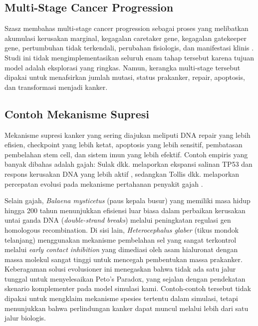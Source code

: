 \subsection{Multi-Stage Cancer Progression}

Szasz membahas multi-stage cancer progression sebagai proses yang melibatkan akumulasi
kerusakan marginal, kegagalan caretaker gene, kegagalan gatekeeper gene,
pertumbuhan tidak terkendali, perubahan fisiologis, dan manifestasi klinis
\cite{szasz2024}. Studi ini tidak mengimplementasikan seluruh enam tahap
tersebut karena tujuan model adalah eksplorasi yang ringkas. Namun, kerangka
multi-stage tersebut dipakai untuk menafsirkan jumlah mutasi, status
prakanker, repair, apoptosis, dan transformasi menjadi kanker.

\subsection{Contoh Mekanisme Supresi}

Mekanisme supresi kanker yang sering diajukan meliputi DNA repair yang lebih
efisien, checkpoint yang lebih ketat, apoptosis yang lebih sensitif, pembatasan
pembelahan stem cell, dan sistem imun yang lebih efektif. Contoh empiris yang
banyak dibahas adalah gajah: Sulak dkk. melaporkan ekspansi salinan TP53 dan
respons kerusakan DNA yang lebih aktif \cite{sulak2016}, sedangkan Tollis dkk.
melaporkan percepatan evolusi pada mekanisme pertahanan penyakit gajah
\cite{tollis2021}.

Selain gajah, \textit{Balaena mysticetus} (paus kepala busur) yang memiliki masa
hidup hingga 200 tahun menunjukkan efisiensi luar biasa dalam perbaikan
kerusakan untai ganda DNA (\textit{double-strand breaks}) melalui peningkatan
regulasi gen homologous recombination. Di sisi lain, \textit{Heterocephalus glaber}
(tikus mondok telanjang) menggunakan mekanisme pembelahan sel yang sangat
terkontrol melalui \textit{early contact inhibition} yang dimediasi oleh asam
hialuronat dengan massa molekul sangat tinggi untuk mencegah pembentukan massa
prakanker. Keberagaman solusi evolusioner ini menegaskan bahwa tidak ada satu
jalur tunggal untuk menyelesaikan Peto's Paradox, yang sejalan dengan pendekatan
skenario komplementer pada model simulasi kami. Contoh-contoh tersebut tidak
dipakai untuk mengklaim mekanisme spesies tertentu dalam simulasi, tetapi menunjukkan
bahwa perlindungan kanker dapat muncul melalui lebih dari satu jalur biologis.
